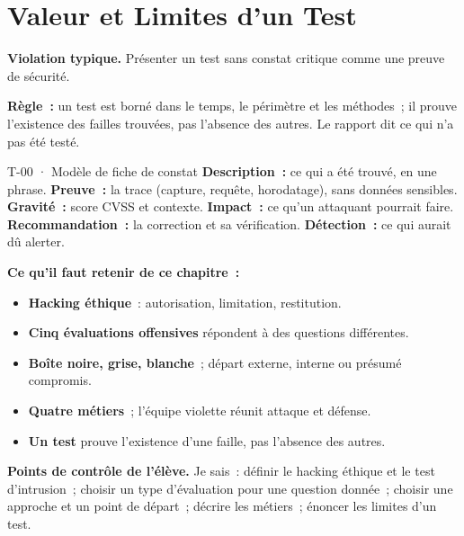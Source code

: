 \section{Valeur et Limites d'un Test}
\label{sec:c01-limites}

\begin{boxalert}
\textbf{Violation typique.} Présenter un test sans constat critique comme
une preuve de sécurité.

\smallskip
\textbf{Règle~:} un test est borné dans le temps, le périmètre et les
méthodes~; il prouve l'existence des failles trouvées, pas l'absence des
autres. Le rapport dit ce qui n'a pas été testé.
\end{boxalert}

\begin{boxobjet}{T-00 · Modèle de fiche de constat}
\textbf{Description~:} ce qui a été trouvé, en une phrase. \textbf{Preuve~:}
la trace (capture, requête, horodatage), sans données sensibles.
\textbf{Gravité~:} score CVSS et contexte. \textbf{Impact~:} ce qu'un
attaquant pourrait faire. \textbf{Recommandation~:} la correction et sa
vérification. \textbf{Détection~:} ce qui aurait dû alerter.
\end{boxobjet}

\separateur

\begin{boxresume}
\textbf{Ce qu'il faut retenir de ce chapitre~:}
\begin{itemize}
    \item \textbf{Hacking éthique}~: autorisation, limitation, restitution.
    \item \textbf{Cinq évaluations offensives} répondent à des questions
          différentes.
    \item \textbf{Boîte noire, grise, blanche}~; départ externe, interne ou
          présumé compromis.
    \item \textbf{Quatre métiers}~; l'équipe violette réunit attaque et
          défense.
    \item \textbf{Un test} prouve l'existence d'une faille, pas l'absence des
          autres.
\end{itemize}
\end{boxresume}

\begin{boxinfo}
\textbf{Points de contrôle de l'élève.} Je sais~: définir le hacking éthique
et le test d'intrusion~; choisir un type d'évaluation pour une question
donnée~; choisir une approche et un point de départ~; décrire les métiers~;
énoncer les limites d'un test.
\end{boxinfo}

